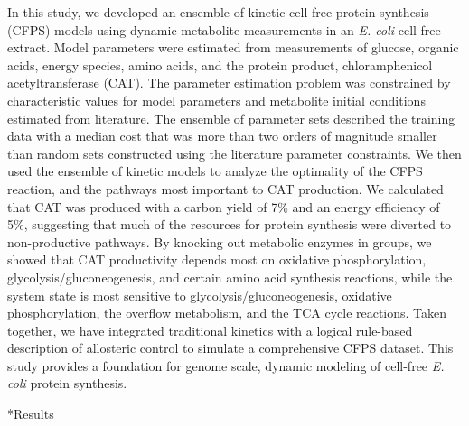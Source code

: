 \documentclass[12pt]{article}
\makeatletter
\renewcommand\section{\@startsection
	{subsection}{2}{0mm}
	{-0.2in}
	{0.05\baselineskip}
	{\normalfont\large\bfseries}}
\makeatother
\begin{document}
In this study, we developed an ensemble of kinetic cell-free protein synthesis (CFPS) models using dynamic metabolite measurements in an \textit{E. coli} cell-free extract.
Model parameters were estimated from measurements of glucose, organic acids, energy species, amino acids, and the protein product, chloramphenicol acetyltransferase (CAT).
The parameter estimation problem was constrained by characteristic values for model parameters and metabolite initial conditions estimated from literature.
The ensemble of parameter sets described the training data with a median cost that was more than two orders of magnitude smaller than random sets constructed using the literature parameter constraints.
We then used the ensemble of kinetic models to analyze the optimality of the CFPS reaction, and the pathways most important to CAT production.
We calculated that CAT was produced with a carbon yield of 7\% and an energy efficiency of 5\%, suggesting that much of the resources for protein synthesis were diverted to non-productive pathways.
By knocking out metabolic enzymes in groups, we showed that CAT productivity depends most on oxidative phosphorylation, glycolysis\slash gluconeogenesis, and certain amino acid synthesis reactions, while the system state is most sensitive to glycolysis\slash gluconeogenesis, oxidative phosphorylation, the overflow metabolism, and the TCA cycle reactions.
Taken together, we have integrated traditional kinetics with a logical rule-based description of allosteric control to simulate a comprehensive CFPS dataset.
This study provides a foundation for genome scale, dynamic modeling of cell-free \textit{E. coli} protein synthesis.

\clearpage

\section*{Results}
\end{document}

